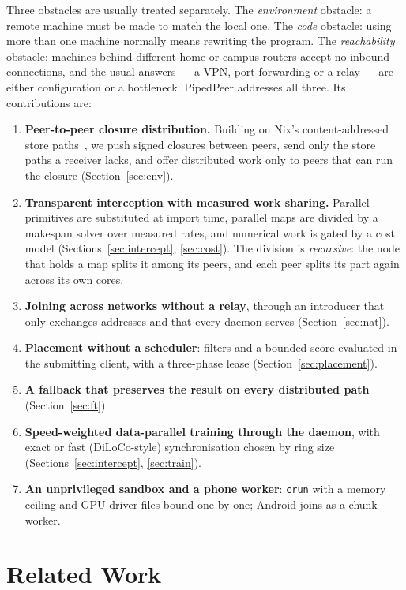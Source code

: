 \documentclass[conference]{IEEEtran}
\begin{document}
Three obstacles are usually treated separately. The \emph{environment}
obstacle: a remote machine must be made to match the local one. The
\emph{code} obstacle: using more than one machine normally means rewriting the
program. The \emph{reachability} obstacle: machines behind different home or
campus routers accept no inbound connections, and the usual answers --- a VPN,
port forwarding or a relay --- are either configuration or a bottleneck.
PipedPeer addresses all three. Its contributions are:

\begin{enumerate}
\item \textbf{Peer-to-peer closure distribution.} Building on Nix's
content-addressed store paths~\cite{dolstra2004nix}, we push signed closures between peers, send
only the store paths a receiver lacks, and offer distributed work only to peers
that can run the closure (Section~\ref{sec:env}).
\item \textbf{Transparent interception with measured work sharing.} Parallel
primitives are substituted at import time, parallel maps are divided by a
makespan solver over measured rates, and numerical work is gated by a cost
model (Sections~\ref{sec:intercept}, \ref{sec:cost}). The division is
\emph{recursive}: the node that holds a map splits it among its peers, and each
peer splits its part again across its own cores.
\item \textbf{Joining across networks without a relay}, through an introducer
that only exchanges addresses and that every daemon serves
(Section~\ref{sec:nat}).
\item \textbf{Placement without a scheduler}: filters and a bounded score
evaluated in the submitting client, with a three-phase lease
(Section~\ref{sec:placement}).
\item \textbf{A fallback that preserves the result on every distributed path}
(Section~\ref{sec:ft}).
\item \textbf{Speed-weighted data-parallel training through the daemon}, with
exact or fast (DiLoCo-style) synchronisation chosen by ring size
(Sections~\ref{sec:intercept}, \ref{sec:train}).
\item \textbf{An unprivileged sandbox and a phone worker}: \texttt{crun} with a
memory ceiling and GPU driver files bound one by one; Android joins as a chunk
worker.
\end{enumerate}

\section{Related Work}
\end{document}
